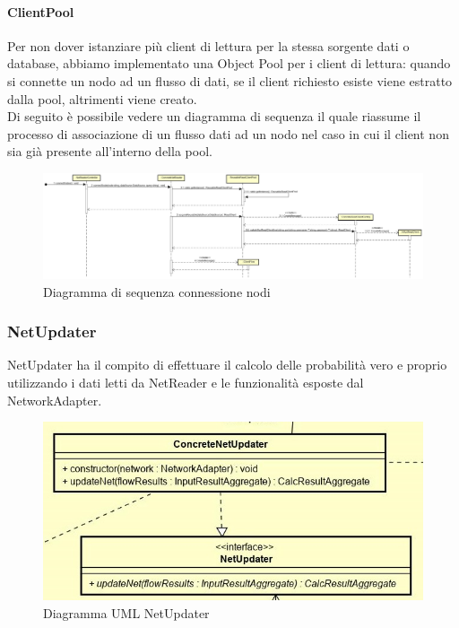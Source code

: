 \paragraph{ClientPool}\Spazio
Per non dover istanziare più client di lettura per la stessa sorgente dati o database, abbiamo implementato una Object Pool per i client di lettura: quando si connette un nodo ad un flusso di dati, se il client richiesto esiste viene estratto dalla pool, altrimenti viene creato.\\
Di seguito è possibile vedere un diagramma di sequenza il quale riassume il processo di associazione di un flusso dati ad un nodo nel caso in cui il client non sia già presente all'interno della pool.
\begin{figure} [H]
	\centerline{
	\includegraphics[scale=0.2]{Img/ConnessioneNodi}}
	\caption{Diagramma di sequenza connessione nodi}\label{}
\end{figure}
\subsubsection{NetUpdater}
NetUpdater ha il compito di effettuare il calcolo delle probabilità vero e proprio utilizzando i dati letti da NetReader e le funzionalità esposte dal NetworkAdapter.
\begin{figure} [H]
	\centering
	\includegraphics[scale=0.8]{Img/NetUpdater}
	\caption{Diagramma UML NetUpdater}\label{}
\end{figure}
